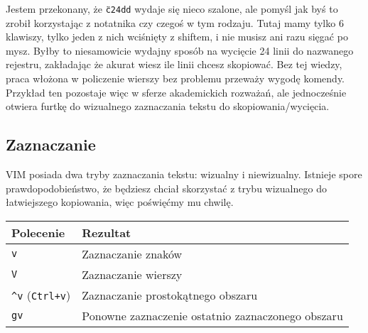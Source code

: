 \documentclass[a4paper,12pt]{article}
\begin{document}
\noindent
Jestem przekonany, że {\tt \"{}c24dd} wydaje się nieco szalone, ale pomyśl jak byś to zrobił korzystając z notatnika czy czegoś w tym rodzaju. Tutaj mamy tylko 6 klawiszy, tylko jeden z nich wciśnięty z shiftem, i nie musisz ani razu sięgać po mysz. Byłby to niesamowicie wydajny sposób na wycięcie 24 linii do nazwanego rejestru, zakładając że akurat wiesz ile linii chcesz skopiować. Bez tej wiedzy, praca włożona w policzenie wierszy bez problemu przeważy wygodę komendy. Przykład ten pozostaje więc w sferze akademickich rozważań, ale jednocześnie otwiera furtkę do wizualnego zaznaczania tekstu do skopiowania/wycięcia.
\subsection{Zaznaczanie}
VIM posiada dwa tryby zaznaczania tekstu: wizualny i niewizualny. Istnieje spore prawdopodobieństwo, że będziesz chciał skorzystać z trybu wizualnego do łatwiejszego kopiowania, więc poświęćmy mu chwilę.

\begin{tabular}{ l | p{} }
{\bf Polecenie} & {\bf Rezultat} \\ \hline
{\tt v} & Zaznaczanie znaków \\
{\tt V} & Zaznaczanie wierszy \\
{\tt \^{}v} ({\tt Ctrl+v}) & Zaznaczanie prostokątnego obszaru \\
{\tt gv} & Ponowne zaznaczenie ostatnio zaznaczonego obszaru \\ \hline
\end{tabular}\\
\end{document}
